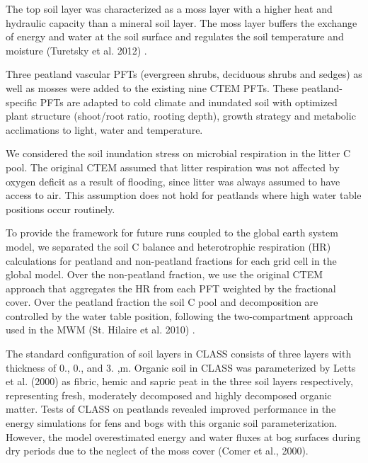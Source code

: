 \begin{DoxyEnumerate}
\item The top soil layer was characterized as a moss layer with a higher heat and hydraulic capacity than a mineral soil layer. The moss layer buffers the exchange of energy and water at the soil surface and regulates the soil temperature and moisture (Turetsky et al. 2012) \cite{Turetsky2012-qh}.
\item Three peatland vascular P\+F\+Ts (evergreen shrubs, deciduous shrubs and sedges) as well as mosses were added to the existing nine C\+T\+E\+M P\+F\+Ts. These peatland-\/specific P\+F\+Ts are adapted to cold climate and inundated soil with optimized plant structure (shoot/root ratio, rooting depth), growth strategy and metabolic acclimations to light, water and temperature.
\item We considered the soil inundation stress on microbial respiration in the litter C pool. The original C\+T\+E\+M assumed that litter respiration was not affected by oxygen deficit as a result of flooding, since litter was always assumed to have access to air. This assumption does not hold for peatlands where high water table positions occur routinely.
\item To provide the framework for future runs coupled to the global earth system model, we separated the soil C balance and heterotrophic respiration (H\+R) calculations for peatland and non-\/peatland fractions for each grid cell in the global model. Over the non-\/peatland fraction, we use the original C\+T\+E\+M approach that aggregates the H\+R from each P\+F\+T weighted by the fractional cover. Over the peatland fraction the soil C pool and decomposition are controlled by the water table position, following the two-\/compartment approach used in the M\+W\+M (St. Hilaire et al. 2010) \cite{St-Hilaire2010-5e9}.
\end{DoxyEnumerate}

The standard configuration of soil layers in C\+L\+A\+S\+S consists of three layers with thickness of 0., 0., and 3. ,m. Organic soil in C\+L\+A\+S\+S was parameterized by Letts et al. (2000) \cite{Letts2000-pg} as fibric, hemic and sapric peat in the three soil layers respectively, representing fresh, moderately decomposed and highly decomposed organic matter. Tests of C\+L\+A\+S\+S on peatlands revealed improved performance in the energy simulations for fens and bogs with this organic soil parameterization. However, the model overestimated energy and water fluxes at bog surfaces during dry periods due to the neglect of the moss cover (Comer et al., 2000).

